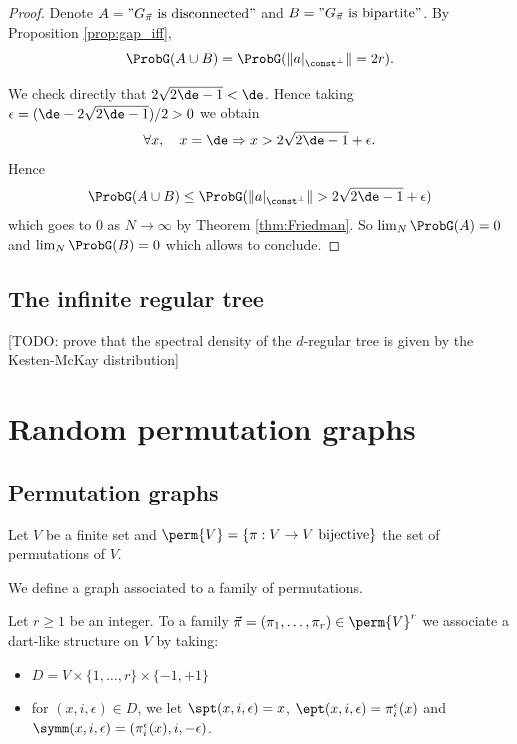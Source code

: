 \begin{proof}
  Denote $A = "G_{\vec{\pi}} \text{ is disconnected}"$ and
  $B = "G_{\vec{\pi}} \text{ is bipartite}"$.
  By Proposition \ref{prop:gap_iff},
  \begin{equation*}
    \ProbG(A \cup B) = \ProbG(\|a|_{\const^\perp}\| = 2r).
  \end{equation*}

  We check directly that $2 \sqrt{2 \de - 1} < \de$.
  Hence taking $\epsilon = (\de - 2 \sqrt{2 \de - 1})/2 > 0$
  we obtain
  \begin{equation*}
    \forall x, \quad x = \de \Rightarrow x > 2 \sqrt{2\de -1} + \epsilon.
  \end{equation*}
  Hence
  \begin{equation*}
    \ProbG(A \cup B) \leq \ProbG(\|a|_{\const^\perp}\| > 2 \sqrt{2\de -1} + \epsilon)
  \end{equation*}
  which goes to $0$ as $N \rightarrow \infty$ by Theorem \ref{thm:Friedman}.
  So $\lim_N \ProbG(A) = 0$ and $\lim_N \ProbG(B)=0$ which allows to conclude.
\end{proof}

\section{The infinite regular tree}
\label{sec:tree}

[TODO: prove that the spectral density of the $d$-regular tree is given by the Kesten-McKay
distribution]


\chapter{Random permutation graphs}


\section{Permutation graphs}

Let $V$ be a finite set and $\perm{V} = \{ \pi : V \rightarrow V \text{ bijective}\}$
the set of permutations of $V$.

We define a graph associated to a family of permutations.

\begin{definition}
  \label{def:dart_of_pi}
  Let $r \geq 1$ be an integer. To a family $\vec{\pi} = (\pi_1, \ldots, \pi_r) \in \perm{V}^r$
  we associate a dart-like structure on $V$ by taking:
  \begin{itemize}
    \item $D = V \times \{1, \ldots, r\} \times \{-1,+1\}$
    \item for $(x,i,\epsilon) \in D$, we let $\spt(x,i,\epsilon) = x$,
    $\ept(x,i,\epsilon) = \pi_i^\epsilon(x)$ and
    $\symm(x,i,\epsilon) = (\pi_i^\epsilon(x),i,-\epsilon)$.
  \end{itemize}
\end{definition}

